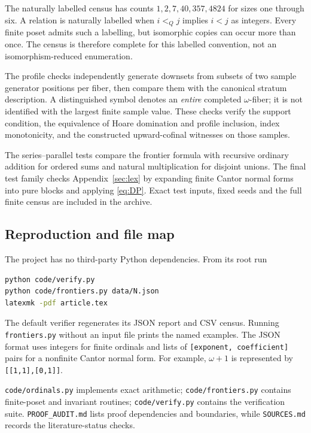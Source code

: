 \documentclass[11pt,a4paper]{article}
\theoremstyle{definition}
\theoremstyle{remark}
\begin{document}
The naturally labelled census has counts
$1,2,7,40,357,4824$ for sizes one through six. A relation is naturally
labelled when $i<_Qj$ implies $i<j$ as integers. Every finite poset admits
such a labelling, but isomorphic copies can occur more than once. The
census is therefore complete for this labelled convention, not an
isomorphism-reduced enumeration.

The profile checks independently generate downsets from subsets of two
sample generator positions per fiber, then compare them with the canonical
stratum description. A distinguished symbol denotes an \emph{entire}
completed $\omega$-fiber; it is not identified with the largest finite
sample value. These checks verify the support condition, the equivalence
of Hoare domination and profile inclusion, index monotonicity, and the
constructed upward-cofinal witnesses on those samples.

The series--parallel tests compare the frontier formula with recursive
ordinary addition for ordered sums and natural multiplication for disjoint
unions. The final test family checks Appendix~\ref{sec:lex} by expanding
finite Cantor normal forms into pure blocks and applying
\eqref{eq:DP}. Exact test inputs, fixed seeds and the full finite census
are included in the archive.

\subsection{Reproduction and file map}

The project has no third-party Python dependencies. From its root run
\begin{lstlisting}[language=bash]
python code/verify.py
python code/frontiers.py data/N.json
latexmk -pdf article.tex
\end{lstlisting}
The default verifier regenerates its JSON report and CSV census. Running
\texttt{frontiers.py} without an input file prints the named examples.
The JSON format uses integers for finite ordinals and lists of
\texttt{[exponent, coefficient]} pairs for a nonfinite Cantor normal form.
For example, $\omega+1$ is represented by
\texttt{[[1,1],[0,1]]}.

\texttt{code/ordinals.py} implements exact arithmetic;
\texttt{code/frontiers.py} contains finite-poset and invariant routines;
\texttt{code/verify.py} contains the verification suite.
\texttt{PROOF\_AUDIT.md} lists proof dependencies and boundaries, while
\texttt{SOURCES.md} records the literature-status checks.
\end{document}
